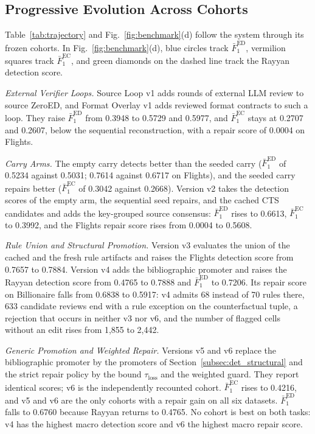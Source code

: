 \documentclass[conference]{IEEEtran}
\begin{document}
\subsection{Progressive Evolution Across Cohorts}
\label{subsec:exp_progressive}



Table~\ref{tab:trajectory} and Fig.~\ref{fig:benchmark}(d) follow the system through its frozen cohorts. In Fig.~\ref{fig:benchmark}(d), blue circles track $\bar{F}_1^{\mathrm{ED}}$, vermilion squares track $\bar{F}_1^{\mathrm{EC}}$, and green diamonds on the dashed line track the Rayyan detection score.

\emph{External Verifier Loops.} Source Loop v1 adds rounds of external LLM review to source ZeroED, and Format Overlay v1 adds reviewed format contracts to such a loop. They raise $\bar{F}_1^{\mathrm{ED}}$ from 0.3948 to 0.5729 and 0.5977, and $\bar{F}_1^{\mathrm{EC}}$ stays at 0.2707 and 0.2607, below the sequential reconstruction, with a repair score of 0.0004 on Flights.

\emph{Carry Arms.} The empty carry detects better than the seeded carry ($\bar{F}_1^{\mathrm{ED}}$ of 0.5234 against 0.5031; 0.7614 against 0.6717 on Flights), and the seeded carry repairs better ($\bar{F}_1^{\mathrm{EC}}$ of 0.3042 against 0.2668). Version v2 takes the detection scores of the empty arm, the sequential seed repairs, and the cached CTS candidates and adds the key-grouped source consensus: $\bar{F}_1^{\mathrm{ED}}$ rises to 0.6613, $\bar{F}_1^{\mathrm{EC}}$ to 0.3992, and the Flights repair score rises from 0.0004 to 0.5608.

\emph{Rule Union and Structural Promotion.} Version v3 evaluates the union of the cached and the fresh rule artifacts and raises the Flights detection score from 0.7657 to 0.7884. Version v4 adds the bibliographic promoter and raises the Rayyan detection score from 0.4765 to 0.7888 and $\bar{F}_1^{\mathrm{ED}}$ to 0.7206. Its repair score on Billionaire falls from 0.6838 to 0.5917: v4 admits 68 instead of 70 rules there, 633 candidate reviews end with a rule exception on the counterfactual tuple, a rejection that occurs in neither v3 nor v6, and the number of flagged cells without an edit rises from 1,855 to 2,442.

\emph{Generic Promotion and Weighted Repair.} Versions v5 and v6 replace the bibliographic promoter by the promoters of Section~\ref{subsec:det_structural} and the strict repair policy by the bound $\tau_{\mathrm{loss}}$ and the weighted guard. They report identical scores; v6 is the independently recounted cohort. $\bar{F}_1^{\mathrm{EC}}$ rises to 0.4216, and v5 and v6 are the only cohorts with a repair gain on all six datasets. $\bar{F}_1^{\mathrm{ED}}$ falls to 0.6760 because Rayyan returns to 0.4765. No cohort is best on both tasks: v4 has the highest macro detection score and v6 the highest macro repair score.
\end{document}
